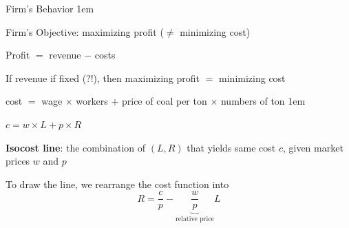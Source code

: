 \documentclass[11pt,aspectratio=43,usenames,dvipsnames]{beamer}
\let\olditemize=\itemize
\let\endolditemize=\enditemize
\renewenvironment{itemize}{\olditemize \itemsep1em}{\endolditemize}
\theoremstyle{definition}
\begin{document}
\begin{frame}{Firm's Behavior}
\label{slide:Firm_s_Behavior}
    \begin{itemize}
        \item Firm's Objective: \alert{maximizing profit} ($\neq$ minimizing cost)
        \item Profit $ = $ revenue $ - $ costs
        \item If revenue if fixed (?!), then \alert{maximizing profit} $=$ minimizing cost
        \item cost $ = $ wage $ \times  $ workers $ + $ price of coal per ton $ \times  $ numbers of ton
        \begin{itemize}
            \item $ c = w \times L + p \times R $
        \end{itemize}
        \item \textbf{Isocost line}: the combination of $ (L, R) $ that yields same cost $ c $, given market prices $ w $ and $ p $
        \item To draw the line, we rearrange the cost function into
        \begin{equation*}
            R = \frac{c}{p} - \underbrace{\frac{w}{p}}_{\text{relative price}} L
        \end{equation*}
    \end{itemize}
\end{frame}
\end{document}
